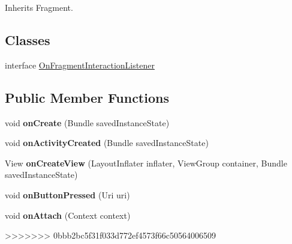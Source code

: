 \begin{DoxyCompactItemize}
\-Inherits \-Fragment.

\subsection*{\-Classes}
\begin{DoxyCompactItemize}
\item 
interface \hyperlink{interfacecom_1_1example_1_1sel_1_1lostfound_1_1SubscribeFragment_1_1OnFragmentInteractionListener}{\-On\-Fragment\-Interaction\-Listener}
\end{DoxyCompactItemize}
\subsection*{\-Public \-Member \-Functions}
\begin{DoxyCompactItemize}
\item 
\hypertarget{classcom_1_1example_1_1sel_1_1lostfound_1_1SubscribeFragment_a7f0cd7584a12208f6cc9e3c8fb1fd680}{void {\bfseries on\-Create} (\-Bundle saved\-Instance\-State)}\label{classcom_1_1example_1_1sel_1_1lostfound_1_1SubscribeFragment_a7f0cd7584a12208f6cc9e3c8fb1fd680}

\item 
\hypertarget{classcom_1_1example_1_1sel_1_1lostfound_1_1SubscribeFragment_a6daae3059443ffda76c69cc51f2d9dec}{void {\bfseries on\-Activity\-Created} (\-Bundle saved\-Instance\-State)}\label{classcom_1_1example_1_1sel_1_1lostfound_1_1SubscribeFragment_a6daae3059443ffda76c69cc51f2d9dec}

\item 
\hypertarget{classcom_1_1example_1_1sel_1_1lostfound_1_1SubscribeFragment_a521224b1fa6e19b441cd064c636137f1}{\-View {\bfseries on\-Create\-View} (\-Layout\-Inflater inflater, \-View\-Group container, \-Bundle saved\-Instance\-State)}\label{classcom_1_1example_1_1sel_1_1lostfound_1_1SubscribeFragment_a521224b1fa6e19b441cd064c636137f1}

\item 
\hypertarget{classcom_1_1example_1_1sel_1_1lostfound_1_1SubscribeFragment_a018589e8d66394f7c11ec44d996fbdcf}{void {\bfseries on\-Button\-Pressed} (\-Uri uri)}\label{classcom_1_1example_1_1sel_1_1lostfound_1_1SubscribeFragment_a018589e8d66394f7c11ec44d996fbdcf}

\item 
\hypertarget{classcom_1_1example_1_1sel_1_1lostfound_1_1SubscribeFragment_adc31ba19040d95af6b9ab1a11677f93d}{void {\bfseries on\-Attach} (\-Context context)}\label{classcom_1_1example_1_1sel_1_1lostfound_1_1SubscribeFragment_adc31ba19040d95af6b9ab1a11677f93d}
>>>>>>> 0bbb2bc5f31f033d772ef4573f66c50564006509


\end{DoxyCompactItemize}
\end{DoxyCompactItemize}
